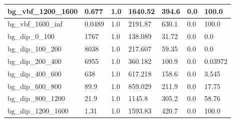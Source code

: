\documentclass[a4paper, 10pt]{article}
\begin{document}
\begin{table}[H]
\begin{center}
\begin{tabular}{|m{23.0mm}|m{23.0mm}|m{18.0mm}|m{19.0mm}|m{19.0mm}|m{19.0mm}|m{19.0mm}|}
      \hline
      {\cellcolor{white}         bg\_vbf\_1200\_1600}& {\cellcolor{white}         0.677}& {\cellcolor{white}         1.0}& {\cellcolor{white}         1640.52}& {\cellcolor{white}         394.6}& {\cellcolor{red}         0.0}& {\cellcolor{red}         100.0}\\
      \hline
      {\cellcolor{white}         bg\_vbf\_1600\_inf}& {\cellcolor{white}         0.0489}& {\cellcolor{white}         1.0}& {\cellcolor{white}         2191.87}& {\cellcolor{white}         630.1}& {\cellcolor{red}         0.0}& {\cellcolor{red}         100.0}\\
      \hline
      {\cellcolor{white}         bg\_dip\_0\_100}& {\cellcolor{white}         1767}& {\cellcolor{white}         1.0}& {\cellcolor{white}         138.089}& {\cellcolor{white}         31.72}& {\cellcolor{green}         0.0}& {\cellcolor{green}         0.0}\\
      \hline
      {\cellcolor{white}         bg\_dip\_100\_200}& {\cellcolor{white}         8038}& {\cellcolor{white}         1.0}& {\cellcolor{white}         217.607}& {\cellcolor{white}         59.35}& {\cellcolor{green}         0.0}& {\cellcolor{green}         0.0}\\
      \hline
      {\cellcolor{white}         bg\_dip\_200\_400}& {\cellcolor{white}         6955}& {\cellcolor{white}         1.0}& {\cellcolor{white}         360.182}& {\cellcolor{white}         100.9}& {\cellcolor{green}         0.0}& {\cellcolor{green}         0.03972}\\
      \hline
      {\cellcolor{white}         bg\_dip\_400\_600}& {\cellcolor{white}         638}& {\cellcolor{white}         1.0}& {\cellcolor{white}         617.218}& {\cellcolor{white}         158.6}& {\cellcolor{green}         0.0}& {\cellcolor{green}         3.545}\\
      \hline
      {\cellcolor{white}         bg\_dip\_600\_800}& {\cellcolor{white}         89.9}& {\cellcolor{white}         1.0}& {\cellcolor{white}         859.029}& {\cellcolor{white}         211.9}& {\cellcolor{red}         0.0}& {\cellcolor{red}         17.75}\\
      \hline
      {\cellcolor{white}         bg\_dip\_800\_1200}& {\cellcolor{white}         21.9}& {\cellcolor{white}         1.0}& {\cellcolor{white}         1145.8}& {\cellcolor{white}         305.2}& {\cellcolor{red}         0.0}& {\cellcolor{red}         58.76}\\
      \hline
      {\cellcolor{white}         bg\_dip\_1200\_1600}& {\cellcolor{white}         1.31}& {\cellcolor{white}         1.0}& {\cellcolor{white}         1593.83}& {\cellcolor{white}         420.7}& {\cellcolor{red}         0.0}& {\cellcolor{red}         100.0}\\

\end{tabular}
\end{center}
\end{table}
\end{document}
